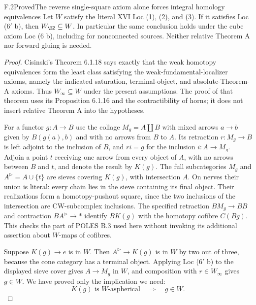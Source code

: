 \begin{claim}{F.2}{Proved}{The reverse single-square axiom alone forces integral homology equivalences}
Let $W$ satisfy the literal XVI Loc (1), (2), and (3). If it satisfies Loc ($6'$ b), then $W_\ZZ\subseteq W$. In particular the same conclusion holds under the cube axiom Loc (6 b), including for nonconnected sources. Neither relative Theorem A nor forward gluing is needed.
\end{claim}
\begin{proof}
Cisinski's Theorem 6.1.18 \cite{FGHCisinski2006} says exactly that the weak homotopy equivalences form the least class satisfying the weak-fundamental-localizer axioms, namely the indicated saturation, terminal-object, and absolute-Theorem-A axioms. Thus $W_\infty\subseteq W$ under the present assumptions. The proof of that theorem uses its Proposition 6.1.16 and the contractibility of horns; it does not insert relative Theorem A into the hypotheses.

For a functor $g:A\to B$ use the collage $M_g=A\amalg B$ with mixed arrows $a\to b$ given by $B(g(a),b)$ and with no arrows from $B$ to $A$. Its retraction $r:M_g\to B$ is left adjoint to the inclusion of $B$, and $ri=g$ for the inclusion $i:A\to M_g$. Adjoin a point $t$ receiving one arrow from every object of $A$, with no arrows between $B$ and $t$, and denote the result by $K(g)$. The full subcategories $M_g$ and $A^{\triangleright}=A\cup\{t\}$ are sieves covering $K(g)$, with intersection $A$. On nerves their union is literal: every chain lies in the sieve containing its final object. Their realizations form a homotopy-pushout square, since the two inclusions of the intersection are CW-subcomplex inclusions. The specified retraction $BM_g\to BB$ and contraction $BA^{\triangleright}\to*$ identify $BK(g)$ with the homotopy cofibre $C(Bg)$. This checks the part of POLES B.3 used here without invoking its additional assertion about $W$-maps of cofibres.

Suppose $K(g)\to e$ is in $W$. Then $A^{\triangleright}\to K(g)$ is in $W$ by two out of three, because the cone category has a terminal object. Applying Loc ($6'$ b) to the displayed sieve cover gives $A\to M_g$ in $W$, and composition with $r\in W_\infty$ gives $g\in W$. We have proved only the implication we need:
\[
 K(g)\text{ is }W\text{-aspherical}\quad\Longrightarrow\quad g\in W.
\]


\end{proof}
